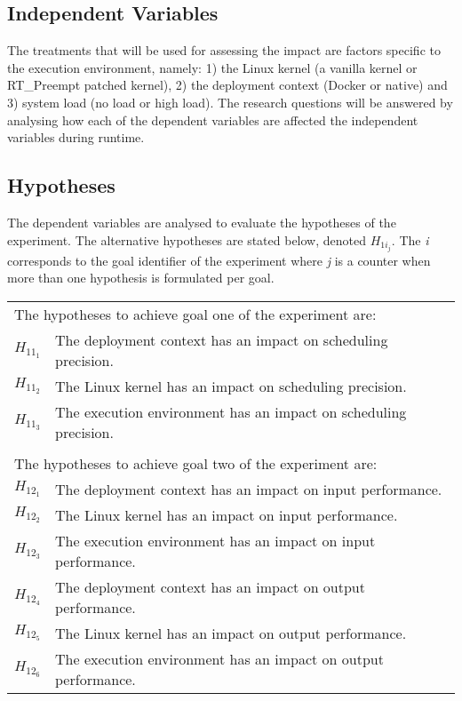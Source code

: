 \subsection{Independent Variables}
The treatments that will be used for assessing the impact are factors specific to the execution environment, namely: 1) the Linux kernel (a vanilla kernel or RT\_Preempt patched kernel), 2) the deployment context (Docker or native) and 3) system load (no load or high load). The research questions will be answered by analysing how each of the dependent variables are affected the independent variables during runtime.


\subsection{Hypotheses}
The dependent variables are analysed to evaluate the hypotheses of the experiment. The alternative hypotheses are stated below, denoted $H_{1i_{j}}$. The \textit{i} corresponds to the goal identifier of the experiment where \textit{j} is a counter when more than one hypothesis is formulated per goal.  

\begin{table}[H]
\begin{tabular}{l|l}
\multicolumn{2}{l}{The hypotheses to achieve goal one of the experiment are:} \\
$H_{11_{1}}$ & The deployment context has an impact on scheduling precision. \\
$H_{11_{2}}$ & The Linux kernel has an impact on scheduling precision. \\
$H_{11_{3}}$ & The execution environment has an impact on scheduling precision. \\          
\multicolumn{2}{l}{} \\
\multicolumn{2}{l}{The hypotheses to achieve goal two of the experiment are:} \\
$H_{12_{1}}$ & The deployment context has an impact on input performance.\\
$H_{12_{2}}$ & The Linux kernel has an impact on input performance.\\
$H_{12_{3}}$ & The execution environment has an impact on input performance.\\
$H_{12_{4}}$ & The deployment context has an impact on output performance.\\
$H_{12_{5}}$ & The Linux kernel has an impact on output performance.\\
$H_{12_{6}}$ & The execution environment has an impact on output performance.                                                          
\end{tabular}
\end{table}


